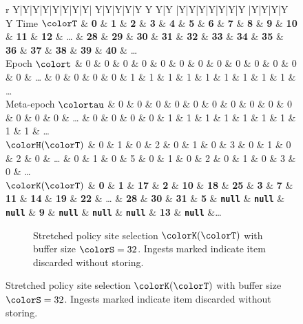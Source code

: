 \begin{figure}[htbp!]
  \centering

\begin{minipage}{\textwidth}
  \scriptsize
  \setlength{\tabcolsep}{2.5pt}
  \begin{tabularx}{\textwidth}{
    r
    Y|Y|Y|Y|Y|Y|Y|Y|
    Y|Y|Y|Y|Y Y Y|Y
    |Y|Y|Y|Y|Y|Y|Y
    |Y|Y|Y|Y Y
    }
     { Time $\colorT$} & \textbf{0} & \textbf{1} & \textbf{2} & \textbf{3} & \textbf{4} & \textbf{5} & \textbf{6} & \textbf{7}
    & \textbf{8} & \textbf{9} & \textbf{10} & \textbf{11} & \textbf{12} %
    &  \ldots
    & \textbf{28} & \textbf{29} & \textbf{30} & \textbf{31}
    & \textbf{32} & \textbf{33} & \textbf{34} & \textbf{35}
    & \textbf{36} & \textbf{37} & \textbf{38} & \textbf{39} & \textbf{40}
    & \ldots \\ \hline
   { Epoch $\colort$} & 0 & 0 & 0 & 0 & 0 & 0 & 0 & 0
    & 0 & 0 & 0 & 0 & 0 %
    &  \ldots
    & 0 & 0 & 0 & 0
    & 1 & 1 & 1 & 1
    & 1 & 1 & 1 & 1 & 1
    & \ldots \\
   { Meta-epoch $\colortau$} & 0 & 0 & 0 & 0 & 0 & 0 & 0 & 0
    & 0 & 0 & 0 & 0 & 0 %
    &  \ldots
    & 0 & 0 & 0 & 0
    & 1 & 1 & 1 & 1
    & 1 & 1 & 1 & 1 & 1
    & \ldots \\
    { \scriptsize$\colorH(\colorT)$} & 0 & 1 & 0 & 2 & 0 & 1 & 0 & 3
    & 0 & 1 & 0 & 2 & 0 %
    &  \ldots
    & 0 & 1 & 0 & 5
    & 0 & 1 & 0 & 2
    & 0 & 1 & 0 & 3 & 0
    & \ldots \\ \hline
     { \scriptsize $\colorK(\colorT)$} & \textbf{0} & \textbf{1} & \textbf{17} & \textbf{2} & \textbf{10} & \textbf{18} & \textbf{25} & \textbf{3}
     & \textbf{7} & \textbf{11} & \textbf{14} & \textbf{19} & \textbf{22} & \ldots
 & \textbf{28} & \textbf{30} & \textbf{31} & \textbf{5} & {\tiny \texttt{\textbf{null\hphantom{}}}}  %
 & {\tiny \texttt{\textbf{null\hphantom{}}}} & {\tiny \texttt{\textbf{null\hphantom{}}}}  & \textbf{9} & {\tiny \texttt{\textbf{null\hphantom{}}}}
 & {\tiny \texttt{\textbf{null\hphantom{}}}} & {\tiny \texttt{\textbf{null\hphantom{}}}} & \textbf{13} & {\tiny \texttt{\textbf{null\hphantom{}}}}  &\ldots
  \end{tabularx}
\end{minipage}
\vspace{-0.5ex}
\begin{subfigure}{\textwidth}
\caption{\footnotesize Stretched policy site selection $\colorK(\colorT)$ with buffer size $\colorS=32$. Ingests marked \nullval{} indicate item discarded without storing.}
\label{fig:hsurf-stretched-implementation-site-selection}
\end{subfigure}
\vspace{-0.5ex}


\end{figure}
